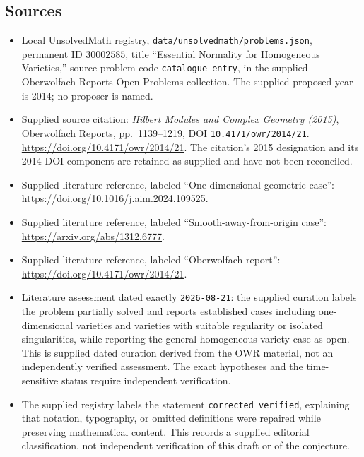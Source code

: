 \documentclass[11pt]{article}
\begin{document}
\subsection{Sources}
\begin{itemize}
\item Local UnsolvedMath registry, \texttt{data/unsolvedmath/problems.json}, permanent ID \(30002585\), title ``Essential Normality for Homogeneous Varieties,'' source problem code \texttt{catalogue entry}, in the supplied Oberwolfach Reports Open Problems collection. The supplied proposed year is 2014; no proposer is named.
\item Supplied source citation: \emph{Hilbert Modules and Complex Geometry (2015)}, Oberwolfach Reports, pp.\ 1139--1219, DOI \texttt{10.4171/owr/2014/21}. \url{https://doi.org/10.4171/owr/2014/21}. The citation's 2015 designation and its 2014 DOI component are retained as supplied and have not been reconciled.
\item Supplied literature reference, labeled ``One-dimensional geometric case'': \url{https://doi.org/10.1016/j.aim.2024.109525}.
\item Supplied literature reference, labeled ``Smooth-away-from-origin case'': \url{https://arxiv.org/abs/1312.6777}.
\item Supplied literature reference, labeled ``Oberwolfach report'': \url{https://doi.org/10.4171/owr/2014/21}.
\item Literature assessment dated exactly \texttt{2026-08-21}: the supplied curation labels the problem partially solved and reports established cases including one-dimensional varieties and varieties with suitable regularity or isolated singularities, while reporting the general homogeneous-variety case as open. This is supplied dated curation derived from the OWR material, not an independently verified assessment. The exact hypotheses and the time-sensitive status require independent verification.
\item The supplied registry labels the statement \texttt{corrected\_verified}, explaining that notation, typography, or omitted definitions were repaired while preserving mathematical content. This records a supplied editorial classification, not independent verification of this draft or of the conjecture.
\end{itemize}
\end{document}
